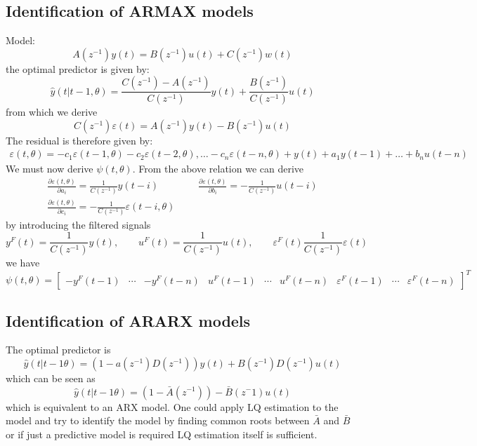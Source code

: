 \documentclass{book}
\theoremstyle{definition}
\theoremstyle{remark}
\theoremstyle{remark}
\begin{document}
\subsection{Identification of ARMAX models}
Model: 
\[
    A(z^{-1})y(t) = B(z^{-1})u(t)+C(z^{-1})w(t)
\]
the optimal predictor is given by:
\[
    \hat{y}(t|t-1,\theta)=\displaystyle\frac{C(z^{-1})-A(z^{-1})}{C(z^{-1})}y(t)+\displaystyle\frac{B(z^{-1})}{C(z^{-1})}u(t)
\]
from which we derive
\[
    C(z^{-1})\varepsilon(t)=A(z^{-1})y(t)-B(z^{-1})u(t)
\]
The residual is therefore given by:
\begin{gather*}
    \varepsilon(t,\theta)= -c_1\varepsilon(t-1,\theta)-c_2\varepsilon(t-2,\theta),\dots -c_n\varepsilon(t-n,\theta)+y(t)+a_1y(t-1)+\dots + b_nu(t-n)
\end{gather*}
We must now derive $\psi(t,\theta)$. From the above relation we can derive
\begin{gather*}
    \displaystyle\frac{\partial\varepsilon(t,\theta)}{\partial a_i} = \displaystyle\frac{1}{C(z^{-1})}y(t-i) \qquad \qquad
    \displaystyle\frac{\partial\varepsilon(t,\theta)}{\partial b_i} = -\displaystyle\frac{1}{C(z^{-1})}u(t-i)\\
    \displaystyle\frac{\partial\varepsilon(t,\theta)}{\partial c_i} = -\displaystyle\frac{1}{C(z^{-1})}\varepsilon(t-i,\theta)
\end{gather*}
by introducing the filtered signals
\[
    y^F(t) = \displaystyle\frac{1}{C(z^{-1})}y(t), \qquad u^F(t) = \displaystyle\frac{1}{C(z^{-1})}u(t), \qquad \varepsilon^F(t)\displaystyle\frac{1}{C(z^{-1})}\varepsilon(t)
\]
we have
\[
    \psi(t,\theta) = \begin{bmatrix}
        -y^F(t-1) & \cdots & -y^F(t-n) & u^F(t-1) & \cdots & u^F(t-n) & \varepsilon^F(t-1) & \cdots & \varepsilon^F(t-n)
    \end{bmatrix}^T
\]

\subsection{Identification of ARARX models}
The optimal predictor is
\[
    \hat{y}(t|t-1\theta)=(1-a(z^{-1})D(z^{-1}))y(t)+B(z^{-1})D(z^{-1})u(t)
\]
which can be seen as
\[
    \hat{y}(t|t-1\theta)=(1-\bar{A}(z^{-1}))-\bar{B}(z^-1)u(t)
\]
which is equivalent to an ARX model. One could apply LQ estimation to the model and try to identify the model by finding common roots between $\bar{A}$ and $\bar{B}$ or if just a predictive model is required LQ estimation itself is sufficient.
\end{document}
